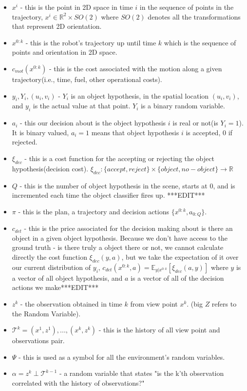 \documentclass{article}
\begin{document}
	\begin{itemize}
		\item $x^i$ - this is the point in 2D space in time $i$ in the sequence of points in the trajectory,
		$x^i \in \mathbb{R}^2 \times SO(2)$ where $SO(2)$ denotes all the transformations that represent 2D orientation.
		\item $x^{0:k}$ - this is the robot's trajectory up until time $k$ which is the sequence of points and orientation in 2D space.    
		\item $c_{mot}(x^{0:k})$ - this is the cost associated with the motion along a given trajectory(i.e., time, fuel, other operational costs).
		\item $y_i, Y_i, (u_i, v_i)$ - $Y_i$ is an object hypothesis, in the spatial location $(u_i, v_i)$,
		and $y_i$ is the actual value at that point. $Y_i$ is a binary random variable. 
		\item $a_i$ - this our decision about is the object hypothesis $i$ is real or not(is $Y_i=1$). It is binary valued, $a_i=1$ means that object hypothesis $i$ is accepted, $0$ if rejected.
		\item $\xi_{dec}$ - this is a cost function for the accepting or rejecting the object hypothesis(decision cost).
		$\xi_{dec} : \{accept,reject\}\times\{object,no-object\}\rightarrow\mathbb{R}$ 
		\item $Q$ - this is the number of object hypothesis in the scene, starts at 0, and is incremented each time the object classifier fires up. 
		***EDIT***
		\item $\pi$ - this is the plan, a trajectory and decision actions $\{x^{0:k},a_{0:Q}\}$.
		\item $c_{det}$ - this is the price associated for the decision making about is there an object in a given object hypothesis. Because we don't have access to the ground truth - is there truly a object there or not,
		we cannot calculate directly the cost function $\xi_{dec}(y,a)$, but we take the expectation of it over our current distribution of $y_i$, $c_{det}(x^{0:k},a)=\mathbb{E}_{y|x^{0:k}}[\xi_{dec}(a,y)]$ where $y$ is a vector of all object hypothesis, and $a$ is a vector of all of the decision actions we make***EDIT***  
		\item $z^k$ - the observation obtained in time $k$ from view point $x^k$. (big $Z$ refers to the Random Variable).
		\item $\mathcal{T}^k = {(x^1,z^1),...,(x^k,z^k)}$ - this is the history of all view point and observations pair.
		\item $\Psi$ - this is used as a symbol for all the environment's random variables.
		\item $\alpha = z^k \perp \mathcal{T}^{k-1}$ - a random variable that states "is the k'th observation correlated with the history of observations?"
	\end{itemize}
\end{document}
